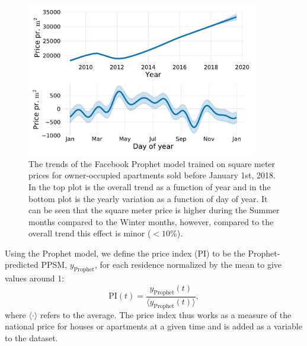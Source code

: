 \begin{figure}
  \includegraphics[draft=false, width=0.9\textwidth, trim=15 15 15 15, clip]{figures/housing/Ejerlejlighed_v18_cut_all_Ncols_all_prophet_trends.pdf}
  \caption[Prophet Trends]
          {The trends of the Facebook Prophet model trained on square meter prices for owner-occupied apartments sold before January 1st, 2018. In the top plot is the overall trend as a function of year and in the bottom plot is the yearly variation as a function of day of year. It can be seen that the square meter price is higher during the Summer months compared to the Winter months, however, compared to the overall trend this effect is minor ($<10\%$). 
          }
  \label{fig:h:prophet_trends}
\end{figure}

Using the Prophet model, we define the price index (PI) to be the Prophet-predicted PPSM, $y_\mathrm{Prophet}$, for each residence normalized by the mean to give values around \num{1}:
\begin{equation}
  \mathrm{PI}(t) = \frac{y_\mathrm{Prophet}(t)}{\langle y_\mathrm{Prophet}(t) \rangle},
\end{equation}
where $\langle \boldsymbol{\cdot} \rangle$ refers to the average. The price index thus works as a measure of the national price for houses or apartments at a given time and is added as a variable to the dataset. 


